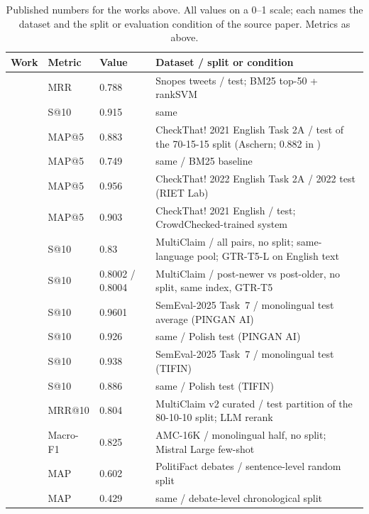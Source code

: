\documentclass[11pt]{article}
\begin{document}
\begin{table}[!t]
\centering
\caption{Published numbers for the works above. All values on a 0--1 scale; each names the dataset and the split or evaluation condition of the source paper. Metrics as above.}
\label{tab:sota}
\small
\setlength{\tabcolsep}{4pt}
\begin{tabular}{@{}llp{1.6cm}p{7.6cm}@{}}
\toprule
Work & Metric & Value & Dataset / split or condition \\
\midrule
\cite{shaar2020that} & MRR & 0.788 & Snopes tweets / test; BM25 top-50 + rankSVM \\
\cite{shaar2020that} & S@10 & 0.915 & same \\
\cite{shaar2021overview} & MAP@5 & 0.883 & CheckThat! 2021 English Task 2A / test of the 70-15-15 split (Aschern; 0.882 in \cite{hardalov2022crowdchecked}) \\
\cite{shaar2021overview} & MAP@5 & 0.749 & same / BM25 baseline \\
\cite{nakov2022overview} & MAP@5 & 0.956 & CheckThat! 2022 English Task 2A / 2022 test (RIET Lab) \\
\cite{hardalov2022crowdchecked} & MAP@5 & 0.903 & CheckThat! 2021 English / test; CrowdChecked-trained system \\
\cite{pikuliak2023multilingual} & S@10 & 0.83 & MultiClaim / all pairs, no split; same-language pool; GTR-T5-L on English text \\
\cite{pikuliak2023multilingual} & S@10 & 0.8002 / 0.8004 & MultiClaim / post-newer vs post-older, no split, same index, GTR-T5 \\
\cite{peng2025semeval} & S@10 & 0.9601 & SemEval-2025 Task~7 / monolingual test average (PINGAN AI) \\
\cite{peng2025semeval} & S@10 & 0.926 & same / Polish test (PINGAN AI) \\
\cite{devadiga2025tifin} & S@10 & 0.938 & SemEval-2025 Task~7 / monolingual test (TIFIN) \\
\cite{devadiga2025tifin} & S@10 & 0.886 & same / Polish test (TIFIN) \\
\cite{ramponi2025multilingual} & MRR@10 & 0.804 & MultiClaim v2 curated / test partition of the 80-10-10 split; LLM rerank \\
\cite{vykopal2025large} & Macro-F1 & 0.825 & AMC-16K / monolingual half, no split; Mistral Large few-shot \\
\cite{shaar2022role} & MAP & 0.602 & PolitiFact debates / sentence-level random split \\
\cite{shaar2022role} & MAP & 0.429 & same / debate-level chronological split \\

\end{tabular}
\end{table}
\end{document}
